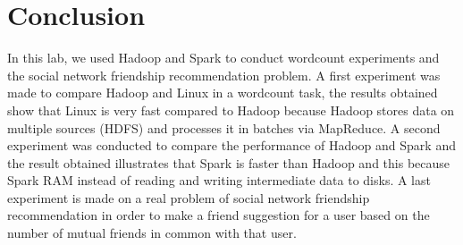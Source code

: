 \documentclass[12pt]{article}
\begin{document}
\section{Conclusion}
In this lab, we used Hadoop and Spark to conduct wordcount experiments and the social network friendship recommendation problem. A first experiment was made to compare Hadoop and Linux in a wordcount task, the results obtained show that Linux is very fast compared to Hadoop because Hadoop stores data on multiple sources (HDFS) and processes it in batches via MapReduce.
A second experiment was conducted to compare the performance of Hadoop and Spark and the result obtained illustrates that Spark is faster than Hadoop and this because Spark RAM instead of reading and writing intermediate data to disks.
A last experiment is made on a real problem of social network friendship recommendation in order to make a friend suggestion for a user based on the number of mutual friends in common with that user.



 
\end{document}

